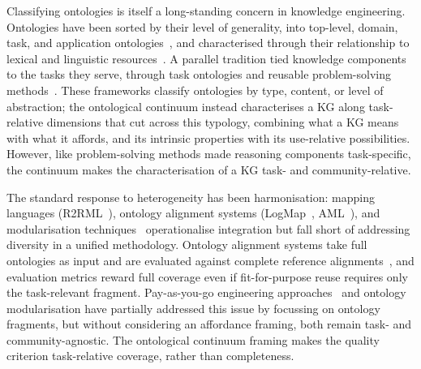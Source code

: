 \documentclass[runningheads]{llncs}
\newenvironment{inboth}{}{}
\begin{document}
\begin{inboth}
Classifying ontologies is itself a long-standing concern in knowledge engineering.
Ontologies have been sorted by their level of generality, into top-level, domain, task, and application ontologies~\cite{guarino1998formal,vanheijst1997using}, and characterised through their relationship to lexical and linguistic resources~\cite{huang2010ontology}.
A parallel tradition tied knowledge components to the tasks they serve, through task ontologies and reusable problem-solving methods~\cite{studer1998knowledge,chandrasekaran1999ontologies}.
These frameworks classify ontologies by type, content, or level of abstraction; the ontological continuum instead characterises a KG along task-relative dimensions that cut across this typology, combining what a KG means with what it affords, and its intrinsic properties with its use-relative possibilities.
However, like problem-solving methods made reasoning components task-specific, the continuum makes the characterisation of a KG task- and community-relative.
\end{inboth}

\begin{inboth}%
The standard response to heterogeneity has been harmonisation: mapping languages (R2RML~\cite{das2012r2rml}), ontology alignment systems (LogMap~\cite{logma_ecai2012}, AML~\cite{faria2023AML}), and modularisation techniques~\cite{LeClair2022modularization} operationalise integration but fall short of addressing diversity in a unified methodology. 
Ontology alignment systems take full ontologies as
input and are evaluated against complete reference alignments~\cite{portisch2024background,hertling2023olala},
and evaluation metrics reward full coverage even if fit-for-purpose
reuse requires only the task-relevant fragment.
Pay-as-you-go engineering approaches~\cite{Sequeda2019pay} and ontology modularisation
have partially addressed this issue by focussing on ontology fragments, but without considering an affordance framing, both
remain task- and community-agnostic.
The ontological continuum framing makes the 
quality criterion task-relative coverage, rather than completeness.
\end{inboth}
\end{document}
